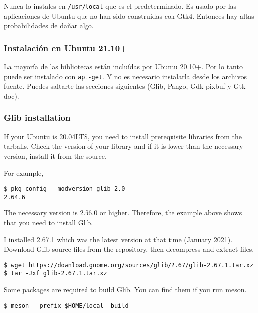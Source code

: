 Nunca lo instales en \passthrough{\lstinline!/usr/local!} que es el
predeterminado. Es usado por las aplicaciones de Ubuntu que no han sido
construidas con Gtk4. Entonces hay altas probabilidades de dañar algo.

\hypertarget{instalaciuxf3n-en-ubuntu-21.10}{%
\subsubsection{Instalación en Ubuntu
21.10+}\label{instalaciuxf3n-en-ubuntu-21.10}}

La mayoría de las bibliotecas están incluídas por Ubuntu 20.10+. Por lo
tanto puede ser instalado con \passthrough{\lstinline!apt-get!}. Y no es
necesario instalarla desde los archivos fuente. Puedes saltarte las
secciones siguientes (Glib, Pango, Gdk-pixbuf y Gtk-doc).

\hypertarget{glib-installation}{%
\subsubsection{Glib installation}\label{glib-installation}}

If your Ubuntu is 20.04LTS, you need to install prerequisite libraries
from the tarballs. Check the version of your library and if it is lower
than the necessary version, install it from the source.

For example,

\begin{lstlisting}
$ pkg-config --modversion glib-2.0
2.64.6
\end{lstlisting}

The necessary version is 2.66.0 or higher. Therefore, the example above
shows that you need to install Glib.

I installed 2.67.1 which was the latest version at that time (January
2021). Download Glib source files from the repository, then decompress
and extract files.

\begin{lstlisting}
$ wget https://download.gnome.org/sources/glib/2.67/glib-2.67.1.tar.xz
$ tar -Jxf glib-2.67.1.tar.xz
\end{lstlisting}

Some packages are required to build Glib. You can find them if you run
meson.

\begin{lstlisting}
$ meson --prefix $HOME/local _build
\end{lstlisting}


